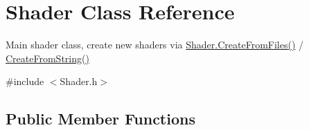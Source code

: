 \hypertarget{class_shader}{}\section{Shader Class Reference}
\label{class_shader}


Main shader class, create new shaders via \mbox{\hyperlink{class_shader_aeca0f4f24d2d7e2ac5fda22bca6e21c5}{Shader.\+Create\+From\+Files()}} / \mbox{\hyperlink{class_shader_a099eeffb7a893ab69cc34b70faed9d3b}{Create\+From\+String()}}  




{\ttfamily \#include $<$Shader.\+h$>$}

\subsection*{Public Member Functions}
